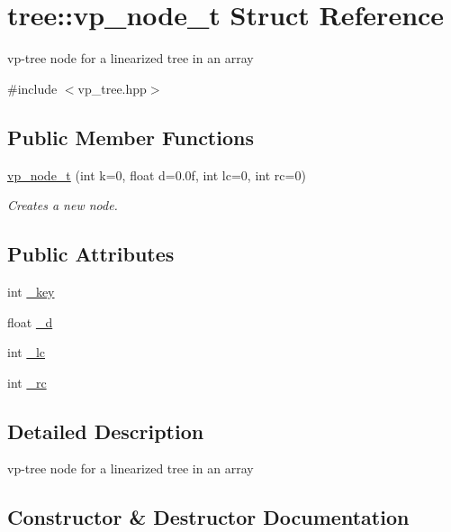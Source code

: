 \hypertarget{structtree_1_1vp__node__t}{}\section{tree\+:\+:vp\+\_\+node\+\_\+t Struct Reference}
\label{structtree_1_1vp__node__t}


vp-\/tree node for a linearized tree in an array  




{\ttfamily \#include $<$vp\+\_\+tree.\+hpp$>$}

\subsection*{Public Member Functions}
\begin{DoxyCompactItemize}
\item 
\hyperlink{structtree_1_1vp__node__t_a2c900072914426bd117d50bf8a8e6876}{vp\+\_\+node\+\_\+t} (int k=0, float d=0.\+0f, int lc=0, int rc=0)
\begin{DoxyCompactList}\small\item\em Creates a new node. \end{DoxyCompactList}\end{DoxyCompactItemize}
\subsection*{Public Attributes}
\begin{DoxyCompactItemize}
\item 
int \hyperlink{structtree_1_1vp__node__t_afb86b117e74d2591551388b2f62d3197}{\+\_\+key}
\item 
float \hyperlink{structtree_1_1vp__node__t_a2a72786ef681fb55e7cc9f1a91a637f5}{\+\_\+d}
\item 
int \hyperlink{structtree_1_1vp__node__t_a36ac11ce1caaf5d34aab924ee27158f4}{\+\_\+lc}
\item 
int \hyperlink{structtree_1_1vp__node__t_a733a0e18db87b13307818a3bbec8e154}{\+\_\+rc}
\end{DoxyCompactItemize}


\subsection{Detailed Description}
vp-\/tree node for a linearized tree in an array 

\subsection{Constructor \& Destructor Documentation}
\hypertarget{structtree_1_1vp__node__t_a2c900072914426bd117d50bf8a8e6876}{}
